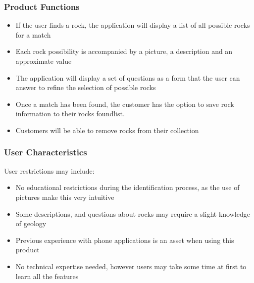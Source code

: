 \documentclass[titlepage]{article}
\begin{document}
\subsubsection{Product Functions}
\begin{itemize}

\item If the user finds a rock, the application will display a list of all possible rocks for a match \\
\item Each rock possibility is accompanied by a picture, a description and an approximate value\\
\item The application will display a set of questions as a form that the user can answer to refine the selection of possible rocks\\
\item Once a match has been found, the customer has the option to save rock information to their \"rocks found\" list.\\
\item Customers will be able to remove rocks from their collection\\



\end{itemize}

\subsubsection{User Characteristics}

User restrictions may include:\\
\begin{itemize}

\item No educational restrictions during the identification process, as the use of pictures make this very intuitive\\
\item Some descriptions, and questions about rocks may require a slight knowledge of geology \\
\item Previous experience with phone applications is an asset when using this product\\
\item No technical expertise needed, however users may take some time at first to learn all the features\\

\end{itemize}
\end{document}

